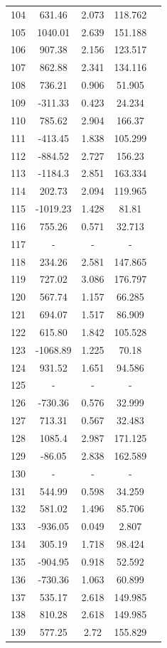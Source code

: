 {\begin{longtable}{ccccc}
104 & 631.46 & 2.073 & 118.762 \\
105 & 1040.01 & 2.639 & 151.188 \\
106 & 907.38 & 2.156 & 123.517 \\
107 & 862.88 & 2.341 & 134.116 \\
108 & 736.21 & 0.906 & 51.905 \\
109 & -311.33 & 0.423 & 24.234 \\
110 & 785.62 & 2.904 & 166.37 \\
111 & -413.45 & 1.838 & 105.299 \\
112 & -884.52 & 2.727 & 156.23 \\
113 & -1184.3 & 2.851 & 163.334 \\
114 & 202.73 & 2.094 & 119.965 \\
115 & -1019.23 & 1.428 & 81.81 \\
116 & 755.26 & 0.571 & 32.713 \\
117 & - & - & - \\ 
118 & 234.26 & 2.581 & 147.865 \\
119 & 727.02 & 3.086 & 176.797 \\
120 & 567.74 & 1.157 & 66.285 \\
121 & 694.07 & 1.517 & 86.909 \\
122 & 615.80 & 1.842 & 105.528 \\
123 & -1068.89 & 1.225 & 70.18 \\
124 & 931.52 & 1.651 & 94.586 \\
125 & - & - & -  \\ 
126 & -730.36 & 0.576 & 32.999 \\
127 & 713.31 & 0.567 & 32.483 \\
128 & 1085.4 & 2.987 & 171.125 \\
129 & -86.05 & 2.838 & 162.589 \\
130 & - & - & -  \\ 
131 & 544.99 & 0.598 & 34.259 \\
132 & 581.02 & 1.496 & 85.706 \\
133 & -936.05 & 0.049 & 2.807 \\
134 & 305.19 & 1.718 & 98.424 \\
135 & -904.95 & 0.918 & 52.592 \\
136 & -730.36 & 1.063 & 60.899 \\
137 & 535.17 & 2.618 & 149.985 \\
138 & 810.28 & 2.618 & 149.985 \\
139 & 577.25 & 2.72 & 155.829 \\

\end{longtable}}
